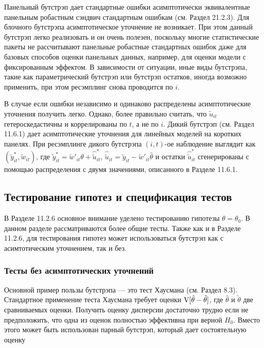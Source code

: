 Панельный бутстрэп дает стандартные ошибки асимптотически эквивалентные панельным робастным сэндвич стандартным ошибкам (см. Раздел 21.2.3). Для блочного бутстрэпа асимптотическое уточнение не возникает. При этом данный бутстрэп легко реализовать и он очень полезен, поскольку многие статистические пакеты не рассчитывают панельные робастные стандартных ошибок даже для базовых способов оценки панельных данных, например, для оценки модели с фиксированным эффектом. В зависимости от ситуации, иные виды бутстрэпа, такие как параметрический бутстрэп или  бутстрэп остатков, иногда возможно применить, при этом ресэмплинг снова проводится по $i$.

В случае если ошибки независимо и одинаково распределены асимптотические уточнения получить легко. Однако, более правильно считать, что $\tilde{u}_{it}$ гетероскедастичны и коррелированы по $t$, а не по $i$. Дикий бутстрэп (см. Раздел 11.6.1) дает асимптотические уточнения  для линейных моделей на коротких панелях. При ресэмплинге дикого бутстрэпа $(i,t)$-ое наблюдение выглядит как $(\tilde{y}^{*}_{it},\tilde{w}_{it})$, где $\tilde{y}^{*}_{it}=\tilde{w}'_{it}\theta+\hat{\tilde{u}}_{it}^*$, $\hat{\tilde{u}}_{it}=\tilde{y}_{it}-\tilde{w}'_{it}\hat{\theta}$ и остатки $\hat{\tilde{u}}_{it}^*$ сгенерированы с помощью распределения с двумя значениями, описанного в Разделе 11.6.1.

\subsection{Тестирование гипотез и спецификация тестов}

В Разделе 11.2.6 основное внимание уделено тестированию гипотезы $\theta=\theta_0$. В данном разделе рассматриваются более общие тесты. Также как и в Разделе 11.2.6, для тестирования гипотез может использоваться бутстрэп как с асимтотическим уточнением, так и без. 


\subsubsection*{Тесты без асимптотических уточнений}

Основной пример пользы бутстрэпа --- это  тест Хаусмана (см. Раздел 8.3). Стандартное применение теста Хаусмана требует оценки $\mathrm{V}[\hat{\theta}-\tilde{\theta}]$, где $\hat{\theta}$ и $\tilde{\theta}$ две сравниваемых оценки. Получить  оценку дисперсии достаточно трудно если не предположить, что одна из оценок полностью эффективна при верной  $H_0$. Вместо этого может быть использован парный бутстрэп, который дает состоятельную оценку

